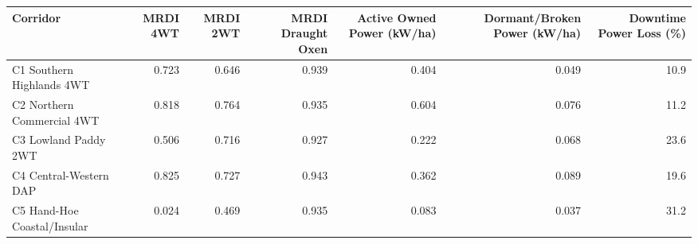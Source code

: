 \begin{tabular}{lrrrrrr}
\toprule
 Corridor                    &   MRDI 4WT &   MRDI 2WT &   MRDI Draught Oxen &   Active Owned Power (kW/ha) &   Dormant/Broken Power (kW/ha) &   Downtime Power Loss (\%) \\
\midrule
 C1 Southern Highlands 4WT   &      0.723 &      0.646 &               0.939 &                        0.404 &                          0.049 &                      10.9 \\
 C2 Northern Commercial 4WT  &      0.818 &      0.764 &               0.935 &                        0.604 &                          0.076 &                      11.2 \\
 C3 Lowland Paddy 2WT        &      0.506 &      0.716 &               0.927 &                        0.222 &                          0.068 &                      23.6 \\
 C4 Central-Western DAP      &      0.825 &      0.727 &               0.943 &                        0.362 &                          0.089 &                      19.6 \\
 C5 Hand-Hoe Coastal/Insular &      0.024 &      0.469 &               0.935 &                        0.083 &                          0.037 &                      31.2 \\
\bottomrule
\end{tabular}